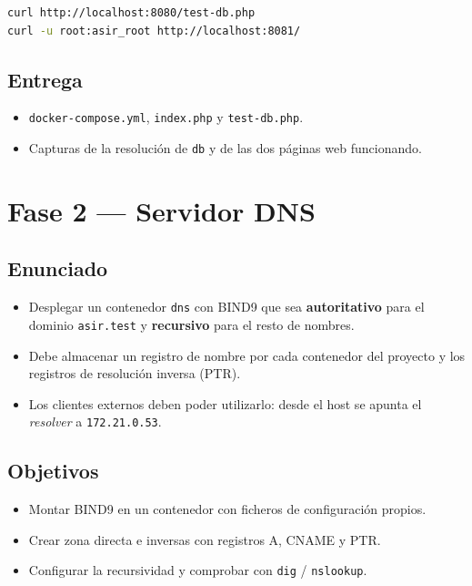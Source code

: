 \documentclass[11pt]{article}
\begin{document}
\begin{lstlisting}[language=bash,numbers=none]
curl http://localhost:8080/test-db.php
curl -u root:asir_root http://localhost:8081/
\end{lstlisting}
\subsection{Entrega}
\label{sec:org000001e}
\begin{itemize}
\item \texttt{docker-compose.yml}, \texttt{index.php} y \texttt{test-db.php}.
\item Capturas de la resolución de \texttt{db} y de las dos páginas web funcionando.
\end{itemize}
\section{Fase 2 — Servidor DNS}
\label{sec:org0000033}

\subsection{Enunciado}
\label{sec:org0000024}
\begin{itemize}
\item Desplegar un contenedor \texttt{dns} con BIND9 que sea \textbf{autoritativo} para el dominio
\texttt{asir.test} y \textbf{recursivo} para el resto de nombres.
\item Debe almacenar un registro de nombre por cada contenedor del proyecto y los
registros de resolución inversa (PTR).
\item Los clientes externos deben poder utilizarlo: desde el host se apunta el
\emph{resolver} a \texttt{172.21.0.53}.
\end{itemize}
\subsection{Objetivos}
\label{sec:org0000027}
\begin{itemize}
\item Montar BIND9 en un contenedor con ficheros de configuración propios.
\item Crear zona directa e inversas con registros A, CNAME y PTR.
\item Configurar la recursividad y comprobar con \texttt{dig} / \texttt{nslookup}.
\end{itemize}
\end{document}
